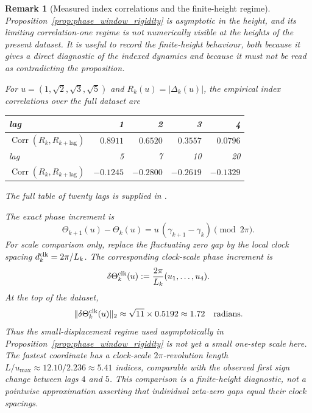 \documentclass[pdflatex,sn-mathphys-num]{sn-jnl}
\numberwithin{equation}{section}
\theoremstyle{thmstyleone}
\theoremstyle{thmstylethree}
\theoremstyle{thmstyletwo}
\newtheorem{remark}[theorem]{Remark}
\newcommand{\Corr}{\operatorname{Corr}}
\newcommand{\1}{\mathbf 1}
\begin{document}
\begin{remark}[Measured index correlations and the finite-height regime]
\label{rem:measured_index_corr}
Proposition~\ref{prop:phase_window_rigidity} is asymptotic in the height, and
its limiting correlation-one regime is not numerically visible at the heights
of the present dataset.  It is useful to record the finite-height behaviour,
both because it gives a direct diagnostic of the indexed dynamics and because
it must not be read as contradicting the proposition.

For \(u=(1,\sqrt2,\sqrt3,\sqrt5)\) and \(R_k(u)=|\Delta_k(u)|\), the empirical
index correlations over the full dataset are
\begin{center}
\small
\begin{tabular}{@{}lrrrr@{}}
\toprule
lag & 1 & 2 & 3 & 4\\
\midrule
\(\Corr(R_k,R_{k+\mathrm{lag}})\)
& \(0.8911\) & \(0.6520\) & \(0.3557\) & \(0.0796\)\\
\midrule
lag & 5 & 7 & 10 & 20\\
\midrule
\(\Corr(R_k,R_{k+\mathrm{lag}})\)
& \(-0.1245\) & \(-0.2800\) & \(-0.2619\) & \(-0.1329\)\\
\bottomrule
\end{tabular}
\end{center}
The full table of twenty lags is supplied in
.

The exact phase increment is
\[
 \Theta_{k+1}(u)-\Theta_k(u)
 =u\,(\gamma_{k+1}-\gamma_k)\pmod{2\pi}.
\]
For scale comparison only, replace the fluctuating zero gap by the local clock
spacing \(d_k^{\rm clk}=2\pi/L_k\).  The corresponding clock-scale phase
increment is
\begin{equation}
 \delta\Theta_k^{\rm clk}(u):=\frac{2\pi}{L_k}(u_1,\ldots,u_4).
\label{eq:phase_step}
\end{equation}
At the top of the dataset,
\[
 \|\delta\Theta_k^{\rm clk}(u)\|_2
 \approx \sqrt{11}\times0.5192\approx1.72
 \quad\hbox{radians}.
\]
Thus the small-displacement regime used asymptotically in
Proposition~\ref{prop:phase_window_rigidity} is not yet a small one-step scale
here.  The fastest coordinate has a clock-scale \(2\pi\)-revolution length
\(L/u_{\max}\approx12.10/2.236\approx5.41\) indices, comparable with the
observed first sign change between lags \(4\) and \(5\).  This comparison is a
finite-height diagnostic, not a pointwise approximation asserting that
individual zeta-zero gaps equal their clock spacings.


\end{remark}
\end{document}

